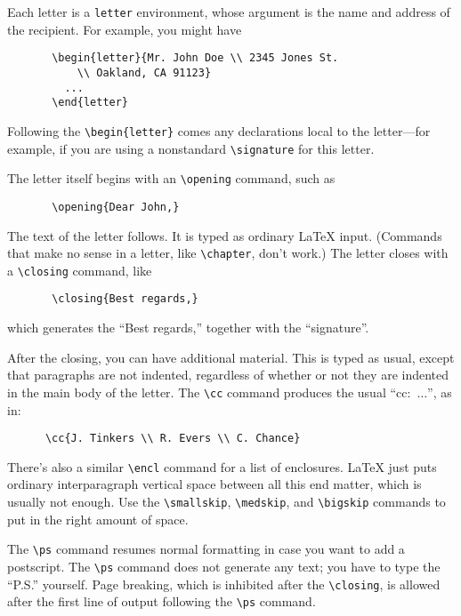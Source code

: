 Each letter is a {\tt letter} environment, whose argument
is the name and address of the recipient.  For example, 
you might have
\begin{verbatim}
       \begin{letter}{Mr. John Doe \\ 2345 Jones St. 
           \\ Oakland, CA 91123}
         ...
       \end{letter}
\end{verbatim}

Following the \verb"\begin{letter}" comes any declarations
local to the letter---for example, if you are using a
nonstandard \hbox{\verb"\signature"} for this letter.

The letter itself begins with an \hbox{\verb"\opening"}
command, such as
\begin{verbatim}
       \opening{Dear John,}
\end{verbatim}
The text of the letter follows.  It is typed as ordinary
\LaTeX{} input.  (Commands that make no sense in a letter,
like \hbox{\verb"\chapter"}, don't work.)  The letter
closes with a \hbox{\verb"\closing"} command, like
\begin{verbatim}
       \closing{Best regards,}
\end{verbatim}
which generates the ``Best regards,'' together with the ``signature''.

After the closing, you can have additional material.  This is typed as
usual, except that paragraphs are not indented, regardless of whether
or not they are indented in the main body of the letter.  The 
\hbox{\verb"\cc"} command produces the usual \hbox{``cc: $\ldots$''},
as in:
\begin{verbatim}
      \cc{J. Tinkers \\ R. Evers \\ C. Chance}
\end{verbatim}
There's also a similar \hbox{\verb"\encl"} command for a list of
enclosures.  \LaTeX{} just puts ordinary interparagraph vertical space
between all this end matter, which is usually not enough.  Use the
\hbox{\verb"\smallskip"}, \hbox{\verb"\medskip"}, and
\hbox{\verb"\bigskip"} commands to put in the right amount of space.

The \verb"\ps" command resumes normal formatting in case you want to
add a postscript.  The \verb"\ps" command does not generate any text;
you have to type the ``P.S.'' yourself.  Page breaking, which is
inhibited after the \hbox{\verb"\closing"}, is allowed after the
first line of output following the \verb"\ps" command.

